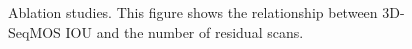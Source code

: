 \documentclass[lettersize,journal]{IEEEtran}
\begin{document}
\begin{figure}[b]
\centering
\vskip 0.2in
\caption{Ablation studies. This figure shows the relationship between 3D-SeqMOS IOU and the number of residual scans.}
\label{fig5}
\end{figure}
\end{document}
